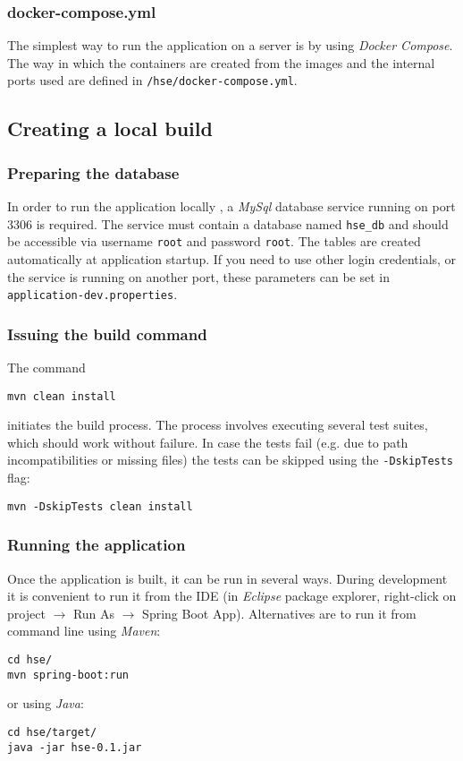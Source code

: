 \documentclass[fleqn]{article}
\begin{document}
\subsubsection{docker-compose.yml}

The simplest way to run the application on a server is by using \emph{Docker Compose}. The way in which the containers are created from the images
and the internal ports used are defined in 
\texttt{/hse/docker-compose.yml}.

\subsection{Creating a local build}

\subsubsection{Preparing the database}

In order to run the application locally , a \emph{MySql} database service running on port 3306 is required. The service must contain a database
named \texttt{hse\_db} and should be accessible via username \texttt{root} and password \texttt{root}. The tables
are created automatically at application startup. If you need to use other login credentials, or the service is running on another port, these
parameters can be set in \texttt{application-dev.properties}.

\subsubsection{Issuing the build command}

The command
\begin{verbatim}
mvn clean install
\end{verbatim}
initiates the build process. The process involves executing several test suites, which should work without failure. In case
the tests fail (e.g. due to path incompatibilities or missing files) the tests can be skipped using the \texttt{-DskipTests} flag:
\begin{verbatim}
mvn -DskipTests clean install
\end{verbatim}

\subsubsection{Running the application}

Once the application is built, it can be run in several ways. During development it is convenient to run it from the IDE (in
\emph{Eclipse} package explorer, right-click on project $\rightarrow$ Run As $\rightarrow$ Spring Boot App). Alternatives are to run it from command
line using \emph{Maven}:
\begin{verbatim}
cd hse/
mvn spring-boot:run
\end{verbatim}
or using \emph{Java}:

\begin{verbatim}
cd hse/target/
java -jar hse-0.1.jar
\end{verbatim}
\end{document}
